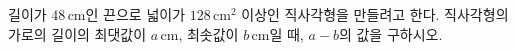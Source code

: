 길이가 $48\,\mathrm{cm}$인 끈으로 넓이가 $128\,\mathrm{cm}^2$ 이상인 직사각형을 만들려고 한다. 직사각형의 가로의 길이의 최댓값이 $a\,\mathrm{cm}$, 최솟값이 $b\,\mathrm{cm}$일 때, $a-b$의 값을 구하시오. 
